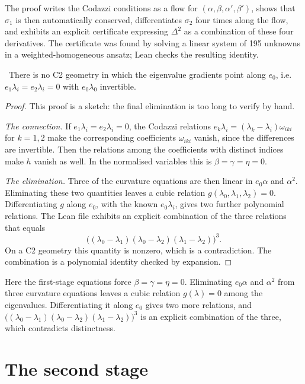 The proof writes the Codazzi conditions as a flow for $(\alpha,\beta,\alpha',\beta')$, shows that $\sigma_1$ is then automatically conserved, differentiates $\sigma_2$ four times along the flow, and exhibits an explicit certificate expressing $\Delta^2$ as a combination of these four derivatives. The certificate was found by solving a linear system of 195 unknowns in a weighted-homogeneous ansatz; Lean checks the resulting identity.

\begin{theorem}\label{thm:aligned}\ver\nogo\
There is no C2 geometry in which the eigenvalue gradients point along $e_0$, i.e.\ $e_1\lambda_i=e_2\lambda_i=0$ with $e_0\lambda_0$ invertible.
\end{theorem}
\begin{proof}
This proof is a sketch: the final elimination is too long to verify by hand.

\emph{The connection.} If $e_1\lambda_i=e_2\lambda_i=0$, the Codazzi relations $e_k\lambda_i=(\lambda_k-\lambda_i)\omega_{iki}$ for $k=1,2$ make the corresponding coefficients $\omega_{iki}$ vanish, since the differences are invertible. Then the relations among the coefficients with distinct indices make $h$ vanish as well. In the normalised variables this is $\beta=\gamma=\eta=0$.

\emph{The elimination.} Three of the curvature equations are then linear in $e_0\alpha$ and $\alpha^2$. Eliminating these two quantities leaves a cubic relation $g(\lambda_0,\lambda_1,\lambda_2)=0$. Differentiating $g$ along $e_0$, with the known $e_0\lambda_i$, gives two further polynomial relations. The Lean file exhibits an explicit combination of the three relations that equals
\[
\bigl((\lambda_0-\lambda_1)(\lambda_0-\lambda_2)(\lambda_1-\lambda_2)\bigr)^3 .
\]
On a C2 geometry this quantity is nonzero, which is a contradiction. The combination is a polynomial identity checked by expansion.
\end{proof}


Here the first-stage equations force $\beta=\gamma=\eta=0$. Eliminating $e_0\alpha$ and $\alpha^2$ from three curvature equations leaves a cubic relation $g(\lambda)=0$ among the eigenvalues. Differentiating it along $e_0$ gives two more relations, and $\bigl((\lambda_0-\lambda_1)(\lambda_0-\lambda_2)(\lambda_1-\lambda_2)\bigr)^3$ is an explicit combination of the three, which contradicts distinctness.

\section{The second stage}

